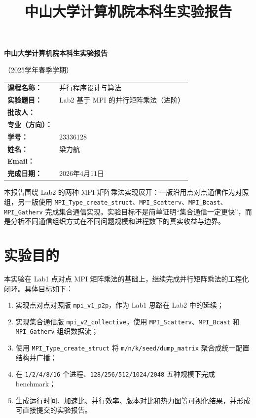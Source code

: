 \documentclass[UTF8,a4paper,12pt,fontset=none]{ctexart}
\title{\bfseries 中山大学计算机院本科生实验报告}
\author{}
\date{}
\begin{document}
\begin{titlepage}
  \centering
  {\bfseries 中山大学计算机院本科生实验报告\par}
  \vspace{0.5em}
  {（2025学年春季学期）\par}
  \vspace{2em}

  \begin{tabularx}{0.9\textwidth}{>{\bfseries}p{4cm}X}
    课程名称： & 并行程序设计与算法 \\
    实验题目： & Lab2 基于 MPI 的并行矩阵乘法（进阶） \\
    批改人： & \\
    专业（方向）： & \\
    学号： & 23336128 \\
    姓名： & 梁力航 \\
    Email： & \\
    完成日期： & 2026年4月11日 \\
  \end{tabularx}

  \vfill
  \begin{minipage}{0.88\textwidth}
    \small
    本报告围绕 Lab2 的两种 MPI 矩阵乘法实现展开：一版沿用点对点通信作为对照组，另一版使用
    \texttt{MPI\_Type\_create\_struct}、\texttt{MPI\_Scatterv}、\texttt{MPI\_Bcast}、
    \texttt{MPI\_Gatherv} 完成集合通信实现。实验目标不是简单证明“集合通信一定更快”，而是分析不同通信组织方式在不同问题规模和进程数下的真实收益与边界。
  \end{minipage}
\end{titlepage}

\section{实验目的}

本实验在 Lab1 点对点 MPI 矩阵乘法的基础上，继续完成并行矩阵乘法的工程化闭环。具体目标如下：

\begin{enumerate}[leftmargin=2.2em]
  \item 实现点对点对照版 \texttt{mpi\_v1\_p2p}，作为 Lab1 思路在 Lab2 中的延续；
  \item 实现集合通信版 \texttt{mpi\_v2\_collective}，使用 \texttt{MPI\_Scatterv}、\texttt{MPI\_Bcast} 和 \texttt{MPI\_Gatherv} 组织数据流；
  \item 使用 \texttt{MPI\_Type\_create\_struct} 将 \texttt{m/n/k/seed/dump\_matrix} 聚合成统一配置结构并广播；
  \item 在 \texttt{1/2/4/8/16} 个进程、\texttt{128/256/512/1024/2048} 五种规模下完成 benchmark；
  \item 生成运行时间、加速比、并行效率、版本对比和热力图等可视化结果，并形成可直接提交的实验报告。
\end{enumerate}
\end{document}

